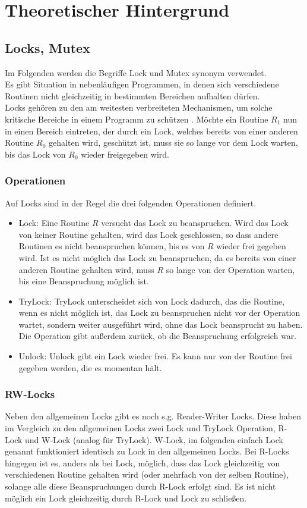 \chapter{Theoretischer Hintergrund}
\section{Locks, Mutex}
Im Folgenden werden die Begriffe Lock und Mutex synonym verwendet.\\
Es gibt Situation in nebenläufigen Programmen, in denen sich verschiedene 
Routinen nicht gleichzeitig in bestimmten Bereichen aufhalten dürfen.\\
Locks gehören zu den am weitesten verbreiteten Mechanismen, um solche kritische 
Bereiche in einem Programm zu schützen \cite{zhou}.
Möchte ein Routine $R_1$ nun in einen Bereich 
eintreten, der durch ein Lock, welches bereits von einer anderen Routine $R_0$ 
gehalten wird, geschützt ist, muss sie so lange vor dem Lock warten, bis das Lock 
von $R_0$ wieder freigegeben wird.
\subsection{Operationen}
Auf Locks sind in der Regel die drei folgenden Operationen definiert.
\begin{itemize}
    \item Lock: Eine Routine $R$ versucht das Lock zu beanspruchen. Wird das Lock 
        von keiner Routine gehalten, wird das Lock geschlossen, so dass andere 
        Routinen es nicht beanspruchen können, bis es von $R$ wieder frei gegeben 
        wird. Ist es nicht möglich das Lock zu beanspruchen, da es bereits von 
        einer anderen Routine gehalten wird, muss $R$ so lange von der Operation 
        warten, bis eine Beanspruchung möglich ist.
    \item TryLock: TryLock unterscheidet sich von Lock dadurch, das die Routine,
        wenn es nicht möglich ist, das Lock zu beanspruchen nicht vor der 
        Operation wartet, sondern weiter ausgeführt wird, ohne das Lock beansprucht
        zu haben. Die Operation gibt außerdem zurück, ob die Beanspruchung 
        erfolgreich war.
    \item Unlock: Unlock gibt ein Lock wieder frei. Es kann nur von der Routine 
        frei gegeben werden, die es momentan hält.
\end{itemize}
\subsection{RW-Locks}
Neben den allgemeinen Locks gibt es noch s.g. Reader-Writer Locks. Diese haben im 
Vergleich zu den allgemeinen Locks zwei Lock und TryLock Operation, R-Lock und 
W-Lock (analog für TryLock). W-Lock, im folgenden einfach Lock genannt funktioniert 
identisch zu Lock in den allgemeinen Locks. Bei R-Locks hingegen ist es, anders 
als bei Lock, möglich, dass das Lock gleichzeitig von verschiedenen Routine gehalten wird
(oder mehrfach von der selben Routine), solange alle diese Beanspruchungen durch 
R-Lock erfolgt sind. Es ist nicht möglich ein Lock gleichzeitig durch R-Lock und 
Lock zu schließen.


